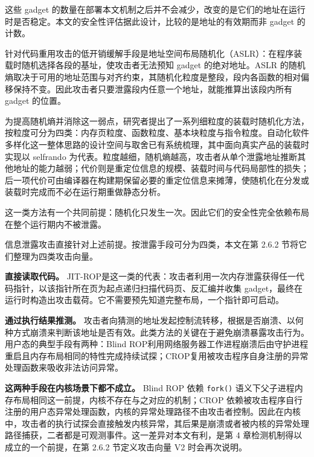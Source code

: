 这些 gadget 的数量在部署本文机制之后并不会减少，改变的是它们的地址在运行时是否稳定。本文的安全性评估据此设计，比较的是地址的有效期而非 gadget 的计数。

针对代码重用攻击的低开销缓解手段是地址空间布局随机化（ASLR）\citep{paxteam2003pax,shacham2004effectiveness}：在程序装载时随机选择各段的基址，使攻击者无法预知 gadget 的绝对地址。ASLR 的随机熵取决于可用的地址范围与对齐约束，其随机化粒度是整段，段内各函数的相对偏移保持不变。因此攻击者只要泄露段内任意一个地址，就能推算出该段内所有 gadget 的位置。

为提高随机熵并消除这一弱点，研究者提出了一系列细粒度的装载时随机化方法，按粒度可分为四类：内存页粒度\citep{backes2014oxymoron}、函数粒度\citep{kil2006aslp,giuffrida2012enhanced}、基本块粒度\citep{wartell2012stirring}与指令粒度\citep{pappas2012smashing,hiser2012ilr}。自动化软件多样化这一整体思路的设计空间与取舍已有系统梳理\citep{larsen2014sok}，其中面向真实产品的装载时实现以 selfrando 为代表\citep{conti2016selfrando}。粒度越细，随机熵越高，攻击者从单个泄露地址推断其他地址的能力越弱；代价则是重定位信息的规模、装载时间与代码局部性的损失；后一项代价可由编译器在构建期保留必要的重定位信息来摊薄，使随机化在分发或装载时完成而不必在运行期重做静态分析\citep{koo2018compiler}。

这一类方法有一个共同前提：随机化只发生一次。因此它们的安全性完全依赖布局在整个运行期内不被泄露。

信息泄露攻击直接针对上述前提。按泄露手段可分为四类，本文在第 2.6.2 节将它们整理为四类攻击向量。

\textbf{直接读取代码。} JIT-ROP\citep{snow2013just}是这一类的代表：攻击者利用一次内存泄露获得任一代码指针，以该指针所在页为起点递归扫描代码页、反汇编并收集 gadget，最终在运行时构造出攻击载荷。它不需要预先知道完整布局，一个指针即可启动。

\textbf{通过执行结果推测。} 攻击者向猜测的地址发起控制流转移，根据是否崩溃、以何种方式崩溃来判断该地址是否有效。此类方法的关键在于避免崩溃暴露攻击行为。用户态的典型手段有两种：Blind ROP\citep{bittau2014blind}利用网络服务器工作进程崩溃后由守护进程重启且内存布局相同的特性完成持续试探；CROP\citep{kollenda2017crop}复用被攻击程序自身注册的异常处理函数来吸收非法访问异常。

\textbf{这两种手段在内核场景下都不成立。} Blind ROP 依赖 \lstinline[breaklines=false]@fork()@ 语义下父子进程内存布局相同这一前提，内核不存在与之对应的机制；CROP 依赖被攻击程序自行注册的用户态异常处理函数，内核的异常处理路径不由攻击者控制。因此在内核中，攻击者的执行试探会直接触发内核异常，其后果是崩溃或者被内核的异常处理路径捕获，二者都是可观测事件。这一差异对本文有利，是第 4 章检测机制得以成立的一个前提，在第 2.6.2 节定义攻击向量 V2 时会再次说明。

